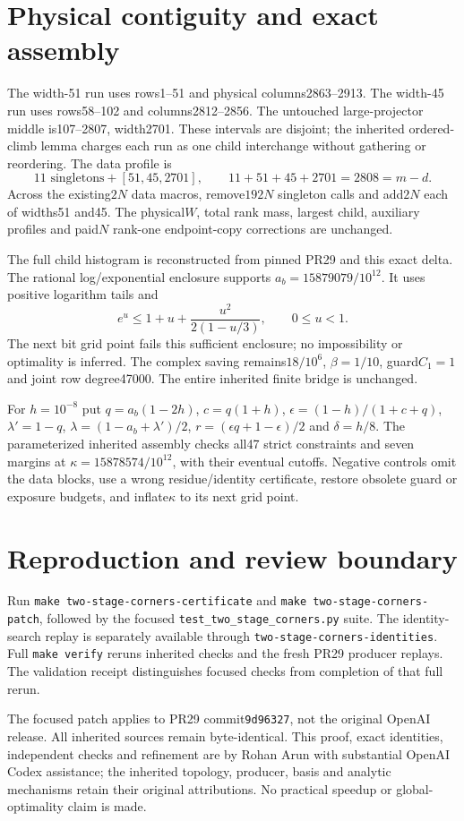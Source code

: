 \documentclass[11pt]{article}
\begin{document}
\section{Physical contiguity and exact assembly}
The width-51 run uses rows1--51 and physical columns2863--2913. The width-45 run uses rows58--102 and columns2812--2856. The untouched large-projector middle is107--2807, width2701. These intervals are disjoint; the inherited ordered-climb lemma charges each run as one child interchange without gathering or reordering. The data profile is
\[
11\text{ singletons}+[51,45,2701],\qquad11+51+45+2701=2808=m-d.
\]
Across the existing$2N$ data macros, remove$192N$ singleton calls and add$2N$ each of widths51 and45. The physical$W$, total rank mass, largest child, auxiliary profiles and paid$N$ rank-one endpoint-copy corrections are unchanged.

The full child histogram is reconstructed from pinned PR29 and this exact delta. The rational log/exponential enclosure supports $a_b=15879079/10^{12}$. It uses positive logarithm tails and
\[
e^u\leq1+u+\frac{u^2}{2(1-u/3)},\qquad0\leq u<1.
\]
The next bit grid point fails this sufficient enclosure; no impossibility or optimality is inferred. The complex saving remains$18/10^6$, $\beta=1/10$, guard$C_1=1$ and joint row degree47000. The entire inherited finite bridge is unchanged.

For $h=10^{-8}$ put $q=a_b(1-2h)$, $c=q(1+h)$, $\epsilon=(1-h)/(1+c+q)$, $\lambda'=1-q$, $\lambda=(1-a_b+\lambda')/2$, $r=(\epsilon q+1-\epsilon)/2$ and $\delta=h/8$. The parameterized inherited assembly checks all47 strict constraints and seven margins at $\kappa=15878574/10^{12}$, with their eventual cutoffs. Negative controls omit the data blocks, use a wrong residue/identity certificate, restore obsolete guard or exposure budgets, and inflate$\kappa$ to its next grid point.

\section{Reproduction and review boundary}
Run \texttt{make two-stage-corners-certificate} and \texttt{make two-stage-corners-patch}, followed by the focused \texttt{test\_two\_stage\_corners.py} suite. The identity-search replay is separately available through \texttt{two-stage-corners-identities}. Full \texttt{make verify} reruns inherited checks and the fresh PR29 producer replays. The validation receipt distinguishes focused checks from completion of that full rerun.

The focused patch applies to PR29 commit\texttt{9d96327}, not the original OpenAI release. All inherited sources remain byte-identical. This proof, exact identities, independent checks and refinement are by Rohan Arun with substantial OpenAI Codex assistance; the inherited topology, producer, basis and analytic mechanisms retain their original attributions. No practical speedup or global-optimality claim is made.
\end{document}
